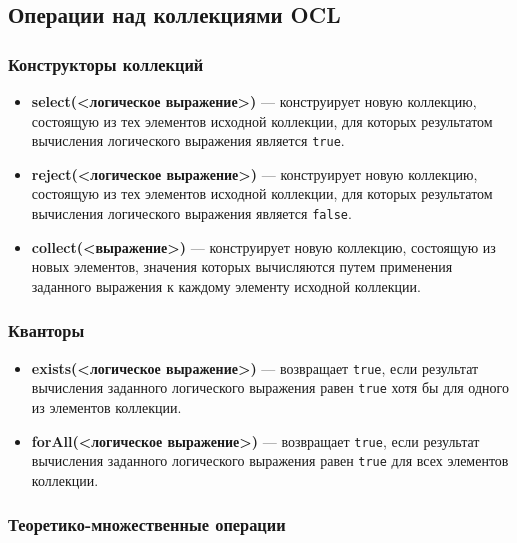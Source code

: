 \documentclass[a4paper,12pt]{article}
\begin{document}
\subsection{Операции над коллекциями OCL}

\subsubsection{Конструкторы коллекций}

\begin{itemize}
    \item \textbf{select(<логическое выражение>)} — конструирует новую коллекцию, состоящую из тех элементов исходной коллекции, для которых результатом вычисления логического выражения является \texttt{true}.
    \item \textbf{reject(<логическое выражение>)} — конструирует новую коллекцию, состоящую из тех элементов исходной коллекции, для которых результатом вычисления логического выражения является \texttt{false}.
    \item \textbf{collect(<выражение>)} — конструирует новую коллекцию, состоящую из новых элементов, значения которых вычисляются путем применения заданного выражения к каждому элементу исходной коллекции.
\end{itemize}

\subsubsection{Кванторы}

\begin{itemize}
    \item \textbf{exists(<логическое выражение>)} — возвращает \texttt{true}, если результат вычисления заданного логического выражения равен \texttt{true} хотя бы для одного из элементов коллекции.
    \item \textbf{forAll(<логическое выражение>)} — возвращает \texttt{true}, если результат вычисления заданного логического выражения равен \texttt{true} для всех элементов коллекции.
\end{itemize}

\subsubsection{Теоретико-множественные операции}
\end{document}
